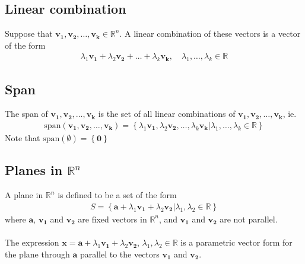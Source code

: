 \documentclass{report}
\begin{document}
	\subsection{Linear combination}

		Suppose that $\mathbf{v_1}, \mathbf{v_2}, \dots, \mathbf{v_k} \in \mathbb{R}^n$. A linear combination of these vectors is a vector of the form
		\begin{align*}
			\lambda_1 \mathbf{v_1} + \lambda_2 \mathbf{v_2} + \dots + \lambda_k \mathbf{v_k}, \quad \lambda_1, \dots, \lambda_k \in \mathbb{R}
		\end{align*}

	\subsection{Span}

		The span of $\mathbf{v_1}, \mathbf{v_2}, \dots, \mathbf{v_k}$ is the set of all linear combinations of $\mathbf{v_1}, \mathbf{v_2}, \dots, \mathbf{v_k}$, ie.
			\begin{align*}
				\text{span}(\mathbf{v_1}, \mathbf{v_2}, \dots, \mathbf{v_k}) = \left\{\lambda_1 \mathbf{v_1}, \lambda_2 \mathbf{v_2}, \dots, \lambda_k \mathbf{v_k} | \lambda_1, \dots, \lambda_k \in \mathbb{R} \right\}
			\end{align*}
		Note that $\text{span}(\emptyset) = \left\{ \mathbf{0} \right\}$

	\subsection{Planes in $\mathbb{R}^n$}

		A plane in $\mathbb{R}^n$ is defined to be a set of the form
			\begin{align*}
				S = \left\{ \mathbf{a} + \lambda_1 \mathbf{v_1} + \lambda_2 \mathbf{v_2} | \lambda_1, \lambda_2 \in \mathbb{R} \right\}
			\end{align*}
		where $\mathbf{a}$, $\mathbf{v_1}$ and $\mathbf{v_2}$ are fixed vectors in $\mathbb{R}^n$, and $\mathbf{v_1}$ and $\mathbf{v_2}$ are not parallel.
		\\ \\
		The expression $\mathbf{x} = \mathbf{a} + \lambda_1 \mathbf{v_1} + \lambda_2 \mathbf{v_2}$, $\lambda_1, \lambda_2 \in \mathbb{R}$ is a parametric vector form for the plane through $\mathbf{a}$ parallel to the vectors $\mathbf{v_1}$ and $\mathbf{v_2}$.
\end{document}
